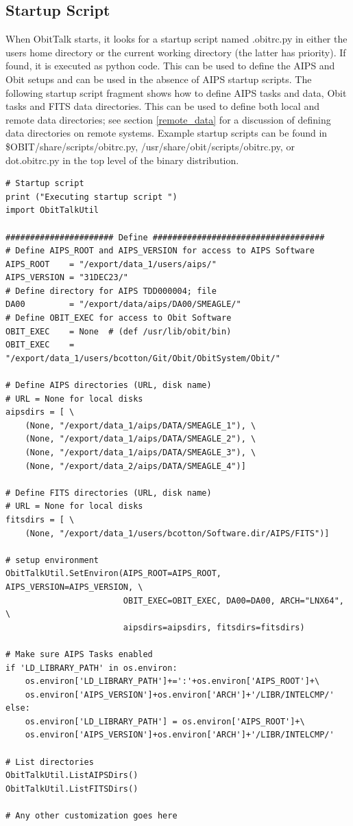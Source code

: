 \documentclass[11pt]{report}
\begin{document}
\subsection{Startup Script}
When ObitTalk starts, it looks for a startup script named .obitrc.py in
either the users home directory or the current working directory (the
latter has priority).
If found, it is executed as python code.
This can be used to define the AIPS and Obit setups and can be used in
the absence of AIPS startup scripts.
The following startup script fragment shows how to define AIPS tasks
and data, Obit tasks and FITS data directories.
This can be used to define both local and remote data directories; see
section \ref{remote_data} for a discussion of defining data
directories on remote systems.
Example startup scripts can be found in
\$OBIT/share/scripts/obitrc.py, /usr/share/obit/scripts/obitrc.py, or
dot.obitrc.py in the top level of the binary distribution.
\begin{verbatim}
# Startup script
print ("Executing startup script ")
import ObitTalkUtil

###################### Define ###################################
# Define AIPS_ROOT and AIPS_VERSION for access to AIPS Software
AIPS_ROOT    = "/export/data_1/users/aips/"
AIPS_VERSION = "31DEC23/"
# Define directory for AIPS TDD000004; file
DA00         = "/export/data/aips/DA00/SMEAGLE/"
# Define OBIT_EXEC for access to Obit Software 
OBIT_EXEC    = None  # (def /usr/lib/obit/bin)
OBIT_EXEC    = "/export/data_1/users/bcotton/Git/Obit/ObitSystem/Obit/"

# Define AIPS directories (URL, disk name)
# URL = None for local disks
aipsdirs = [ \
    (None, "/export/data_1/aips/DATA/SMEAGLE_1"), \
    (None, "/export/data_1/aips/DATA/SMEAGLE_2"), \
    (None, "/export/data_1/aips/DATA/SMEAGLE_3"), \
    (None, "/export/data_2/aips/DATA/SMEAGLE_4")]

# Define FITS directories (URL, disk name)
# URL = None for local disks
fitsdirs = [ \
    (None, "/export/data_1/users/bcotton/Software.dir/AIPS/FITS")]

# setup environment
ObitTalkUtil.SetEnviron(AIPS_ROOT=AIPS_ROOT, AIPS_VERSION=AIPS_VERSION, \
                        OBIT_EXEC=OBIT_EXEC, DA00=DA00, ARCH="LNX64",  \
                        aipsdirs=aipsdirs, fitsdirs=fitsdirs)

# Make sure AIPS Tasks enabled
if 'LD_LIBRARY_PATH' in os.environ:
    os.environ['LD_LIBRARY_PATH']+=':'+os.environ['AIPS_ROOT']+\
    os.environ['AIPS_VERSION']+os.environ['ARCH']+'/LIBR/INTELCMP/'
else:
    os.environ['LD_LIBRARY_PATH'] = os.environ['AIPS_ROOT']+\
    os.environ['AIPS_VERSION']+os.environ['ARCH']+'/LIBR/INTELCMP/'

# List directories
ObitTalkUtil.ListAIPSDirs()
ObitTalkUtil.ListFITSDirs()

# Any other customization goes here
\end{verbatim}
\end{document}
